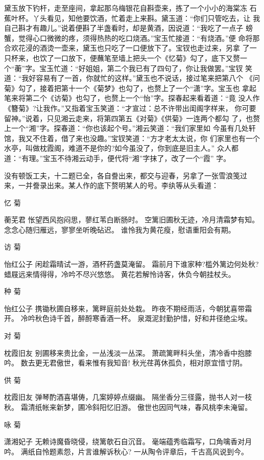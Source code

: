 黛玉放下钓杆，走至座间，拿起那乌梅银花自斟壶来，拣了一个小小的海棠冻
石蕉叶杯。丫头看见，知他要饮酒，忙着走上来斟。黛玉道：“你们只管吃去，让
我自己斟才有趣儿。”说着便斟了半盏看时，却是黄酒，因说道：“我吃了一点子
螃蟹，觉得心口微微的疼，须得热热的吃口烧酒。”宝玉忙接道：“有烧酒。”便
命将那合欢花浸的酒烫一壶来，黛玉也只吃了一口便放下了。宝钗也走过来，另拿
了一只杯来，也饮了一口放下，便蘸笔至墙上把头一个《忆菊》勾了，底下又赘一
个“蘅”字。宝玉忙道：“好姐姐，第二个我已有了四句了，你让我做罢。”宝钗
笑道：“我好容易有了一首，你就忙的这样。”黛玉也不说话，接过笔来把第八个
《问菊》勾了，接着把第十一个《菊梦》也勾了，也赘上了一个“潇”字。宝玉也
拿起笔来将第二个《访菊》也勾了，也赘上一个“怡”字。探春起来看着道：“竟
没人作《簪菊》?让我作。”又指着宝玉笑道：“才宣过：总不许带出闺阁字样来，
你可要留神。”说着，只见湘云走来，将第四第五《对菊》《供菊》一连两个都勾
了，也赘上一个“湘”字。探春道：“你也该起个号。”湘云笑道：“我们家里如
今虽有几处轩馆，我又不住着，借了来也没趣。”宝钗笑道：“方才老太太说，你
们家里也有一个水亭，叫做枕霞阁，难道不是你的?如今虽没了，你到底是旧主人。”
众人都道：“有理。”宝玉不待湘云动手，便代将“湘”字抹了，改了一个“霞”
字。

没有顿饭工夫，十二题已全，各自誊出来，都交与迎春，另拿了一张雪浪笺过
来，一并誊录出来。某人作的底下赘明某人的号。李纨等从头看道：

忆
菊

蘅芜君
怅望西风抱闷思，蓼红苇白断肠时。
空篱旧圃秋无迹，冷月清霜梦有知。
念念心随归雁远，寥寥坐听晚砧迟。
谁怜我为黄花瘦，慰语重阳会有期。

访
菊

怡红公子
闲趁霜晴试一游，酒杯药盏莫淹留。
霜前月下谁家种?槛外篱边何处秋?
蜡屐远来情得得，冷吟不尽兴悠悠。
黄花若解怜诗客，休负今朝挂杖头。

种
菊

怡红公子
携锄秋圃自移来，篱畔庭前处处栽。
昨夜不期经雨活，今朝犹喜带霜开。
冷吟秋色诗千首，醉酹寒香酒一杯。
泉溉泥封勤护惜，好和井径绝尘埃。

对
菊

枕霞旧友
别圃移来贵比金，一丛浅淡一丛深。
萧疏篱畔科头坐，清冷香中抱膝吟。
数去更无君傲世，看来惟有我知音!
秋光荏苒休孤负，相对原宜惜寸阴。

供
菊

枕霞旧友
弹琴酌酒喜堪俦，几案婷婷点缀幽。
隔坐香分三径露，抛书人对一枝秋。
霜清纸帐来新梦，圃冷斜阳忆旧游。
傲世也因同气味，春风桃李未淹留。

咏
菊

潇湘妃子
无赖诗魔昏晓侵，绕篱欹石自沉音。
毫端蕴秀临霜写，口角噙香对月吟。
满纸自怜题素怨，片言谁解诉秋心?
一从陶令评章后，千古高风说到今。

